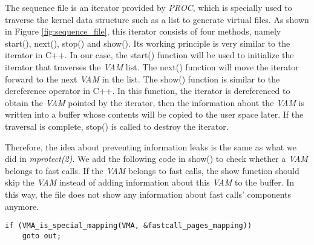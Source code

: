 The sequence file is an iterator provided by \emph{PROC}, 
which is specially used to traverse the kernel data structure 
such as a list to generate virtual files. As shown in Figure \ref{fig:sequence_file}, this 
iterator consists of four methods, namely start(), next(), stop() 
and show(). Its working principle is very similar to the iterator in C++. 
In our case, the start() function will be used to initialize the iterator 
that traverses the \emph{VAM} list. The next() function will move the iterator 
forward to the next \emph{VAM} in the list. The show() function is similar 
to the dereference operator in C++. In this function,  the iterator is 
dereferenced to obtain the \emph{VAM} pointed by the iterator, then the 
information about the \emph{VAM} is written into a buffer whose contents 
will be copied to the user space later. If the traversal is complete, 
stop() is called to destroy the iterator.

Therefore, the idea about preventing information leaks is the
same as what we did in \emph{mprotect(2)}. We add the following code in show() to 
check whether a \emph{VAM} belongs to fast calls.  If the \emph{VAM} 
belongs to fast calls, the show function should skip the \emph{VAM} 
instead of adding information about this \emph{VAM} to the buffer. 
In this way, the file does not show any information about 
fast calls' components anymore.



\begin{lstlisting}[style=CStyle]
  if (VMA_is_special_mapping(VMA, &fastcall_pages_mapping))
    goto out;
\end{lstlisting}


\cleardoublepage





